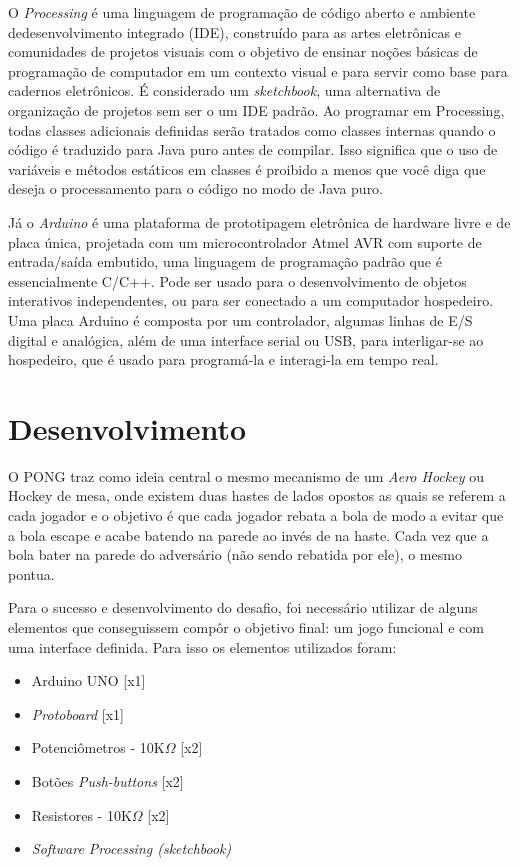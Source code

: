 \documentclass[11pt, a4paper, twocolumn]{article}
\begin{document}
    O \textit{Processing} é uma linguagem de programação de código aberto e ambiente dedesenvolvimento integrado 
    (IDE), construído para as artes eletrônicas e comunidades de projetos visuais com o objetivo de 
    ensinar noções básicas de programação de computador em um contexto visual e para servir como base para 
    cadernos eletrônicos. É considerado um \textit{sketchbook}, uma alternativa de organização de 
    projetos sem ser o um IDE padrão. Ao programar em Processing, todas classes adicionais definidas serão
    tratados como classes internas quando o código é traduzido para Java puro antes de
    compilar. Isso significa que o uso de variáveis e métodos estáticos em classes é proibido
    a menos que você diga que deseja o processamento para o código no modo de Java puro.
    
    Já o \textit{Arduino} é uma plataforma de prototipagem eletrônica de hardware livre e de placa única,
    projetada com um microcontrolador Atmel AVR com suporte de entrada/saída embutido, uma
    linguagem de programação padrão que é essencialmente C/C++. 
    Pode ser usado para o desenvolvimento de objetos interativos independentes, ou para ser
    conectado a um computador hospedeiro. Uma placa Arduino é composta por um controlador,
    algumas linhas de E/S digital e analógica, além de uma interface serial ou USB, para
    interligar-se ao hospedeiro, que é usado para programá-la e interagi-la em tempo real.
\section{Desenvolvimento}

O PONG traz como ideia central o mesmo mecanismo de um \textit{Aero Hockey} ou 
    Hockey de mesa, onde existem duas hastes de lados opostos as quais se referem a cada jogador e o objetivo é que cada 
    jogador rebata a bola de modo a evitar que a bola escape e acabe batendo na parede ao invés de na haste. Cada vez que a bola
    bater na parede do adversário (não sendo rebatida por ele), o mesmo pontua. 

    Para o sucesso e desenvolvimento do desafio, foi necessário utilizar de alguns elementos que conseguissem compôr 
    o objetivo final: um jogo funcional e com uma interface definida. Para isso os elementos utilizados foram:
    \begin{itemize}
        \item Arduino UNO [x1]
        \item \textit{Protoboard} [x1]
        \item Potenciômetros - 10K$\Omega$ [x2]
        \item Botões \textit{Push-buttons} [x2]
        \item Resistores - 10K$\Omega$ [x2]
        \item \textit{Software Processing (sketchbook)}
    \end{itemize}
\end{document}
